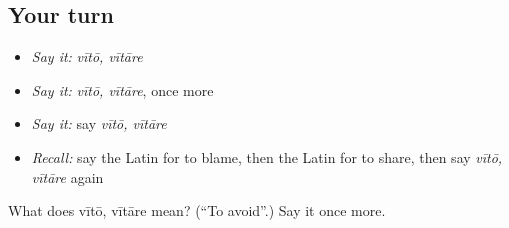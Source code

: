 \subsection*{Your turn}
\begin{itemize}
\raggedright
  \item \emph{Say it:} \emph{vītō, vītāre}
  \item \emph{Say it:} \emph{vītō, vītāre}, once more
  \item \emph{Say it:} say \emph{vītō, vītāre}
  \item \emph{Recall:} say the Latin for to blame, then the Latin for to share, then say \emph{vītō, vītāre} again
\end{itemize}

\begin{tcolorbox}[breakable,colback=teal!4,colframe=teal!35!black,title={Before you move on}]
What does vītō, vītāre mean? (\textquotedblleft{}To avoid\textquotedblright{}.) Say it once more.
\end{tcolorbox}

